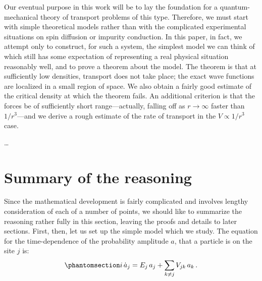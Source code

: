 \documentclass[%
	english,%
	 a4paper,%
	titlepage,%
	fleqn]{article}
\begin{document}
Our eventual purpose in this work will be to lay the foundation for a
quantum-mechanical theory of transport problems of this type. Therefore,
we must start with simple theoretical models rather than with the
complicated experimental situations on spin diffusion or impurity
conduction. In this paper, in fact, we attempt only to construct, for
such a system, the simplest model we can think of which still has some
expectation of representing a real physical situation reasonably well,
and to prove a theorem about the model. The theorem is that at
sufficiently low densities, transport does not take place; the exact
wave functions are localized in a small region of space. We also obtain
a fairly good estimate of the critical density at which the theorem
fails. An additional criterion is that the forces be of sufficiently
short range---actually, falling off as \(r \rightarrow \infty\) faster
than \(1/r^3\)---and we derive a rough estimate of the rate of transport
in the \(V \propto 1/r^3\) case.

\ldots{}

\section{Summary of the reasoning}\label{summary-of-the-reasoning}

Since the mathematical development is fairly complicated and involves
lengthy consideration of each of a number of points, we should like to
summarize the reasoning rather fully in this section, leaving the proofs
and details to later sections. First, then, let us set up the simple
model which we study. The equation for the time-dependence of the
probability amplitude \(a\), that a particle is on the site \(j\) is:
\begin{equation}\phantomsection\label{eq:1}{i \, \dot{a}_j = E_j \, a_j + \sum_{k \neq j} V_{j k} \, a_k \,.}\end{equation}






\printbibliography
\end{document}
